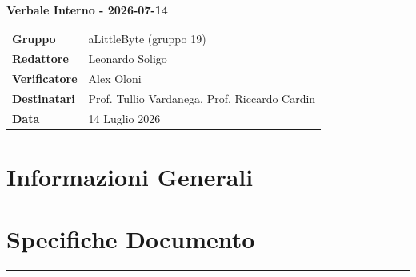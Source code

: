 \documentclass[a4paper,12pt]{article}
\begin{document}
\thispagestyle{firstpage}

\vspace*{0.5cm}

\begin{center}
    {\LARGE \textbf{Verbale Interno - 2026-07-14}}
\end{center}

\vspace{1.5cm}

\begin{center}
    \renewcommand{\arraystretch}{1.3}
    \begin{tcolorbox}[
        width=0.92\textwidth,
        colback=gray!6,
        colframe=gray!45,
        boxrule=0.5pt,
        arc=2mm,
        boxsep=0pt,
        left=8pt, right=8pt, top=8pt, bottom=8pt
    ]
        \begin{tabularx}{\linewidth}{>{\bfseries}p{3.5cm} X}
            Gruppo      & aLittleByte (gruppo 19) \\
            Redattore   & Leonardo Soligo \\
            Verificatore & Alex Oloni\\
            Destinatari & Prof. Tullio Vardanega, Prof. Riccardo Cardin \\
            Data        & 14 Luglio 2026\\
        \end{tabularx}
    \end{tcolorbox}
\end{center}

\newpage

\tableofcontents
\newpage
\section{Informazioni Generali}
\section*{Specifiche Documento}
\hrule
\vspace{1cm}
\end{document}
